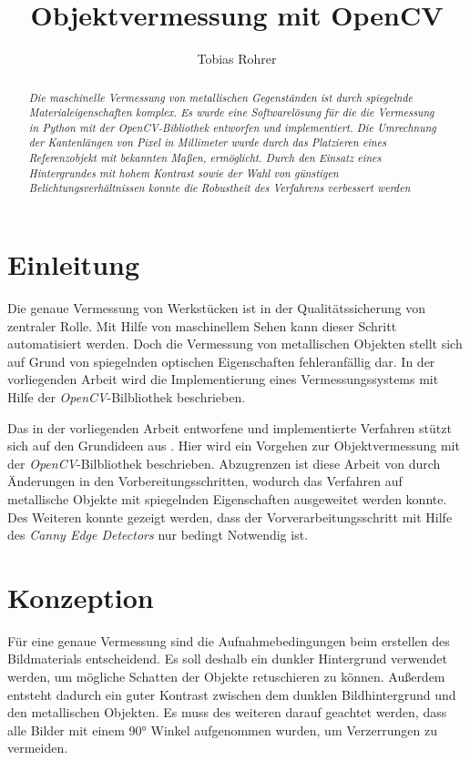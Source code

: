 \documentclass[twocolumn,10pt]{asme2ej}
\title{Objektvermessung mit OpenCV}
\author{Tobias Rohrer
    \affiliation{
	Data Science (Master)\\
	Hochschule Darmstadt\\
    Email: Tobias.Rohrer@outlook.com
    }	
}
\begin{document}
\maketitle    

\begin{abstract}
{\it Die maschinelle Vermessung von metallischen Gegenständen ist durch spiegelnde Materialeigenschaften komplex. Es wurde eine Softwarelösung für die die Vermessung in Python mit der \emph{OpenCV}-Bibliothek\cite{opencv_library} entworfen und implementiert. Die Umrechnung der Kantenlängen von Pixel in Millimeter wurde durch das Platzieren eines Referenzobjekt mit bekannten Maßen, ermöglicht.  Durch den Einsatz eines Hintergrundes mit hohem Kontrast sowie der Wahl von günstigen Belichtungsverhältnissen konnte die Robustheit des Verfahrens verbessert werden
}
\end{abstract}

\section{Einleitung}
Die genaue Vermessung von Werkstücken ist in der Qualitätssicherung von zentraler Rolle. Mit Hilfe von maschinellem Sehen kann dieser Schritt automatisiert werden. Doch die Vermessung von metallischen Objekten stellt sich auf Grund von spiegelnden optischen Eigenschaften fehleranfällig dar. In der vorliegenden Arbeit wird die Implementierung eines Vermessungssystems mit Hilfe der \emph{OpenCV}-Bilbliothek beschrieben. 

Das in der vorliegenden Arbeit entworfene und implementierte Verfahren stützt sich auf den Grundideen aus \cite{PyImageSearch}. Hier wird ein Vorgehen zur Objektvermessung mit der  \emph{OpenCV}-Bilbliothek beschrieben. Abzugrenzen ist diese Arbeit von \cite{PyImageSearch} durch Änderungen in den Vorbereitungsschritten, wodurch das Verfahren auf metallische Objekte mit spiegelnden Eigenschaften ausgeweitet werden konnte. Des Weiteren konnte gezeigt werden, dass der Vorverarbeitungsschritt mit Hilfe des \emph{Canny Edge Detectors}\cite{Canny} nur bedingt Notwendig ist.

\section{Konzeption}\label{sec:2}
Für eine genaue Vermessung sind die Aufnahmebedingungen beim erstellen des Bildmaterials entscheidend. Es soll deshalb ein dunkler Hintergrund verwendet werden, um mögliche Schatten der Objekte retuschieren zu können. Außerdem entsteht dadurch ein guter Kontrast zwischen dem dunklen Bildhintergrund und den metallischen Objekten. Es muss des weiteren darauf geachtet werden, dass alle Bilder mit einem \ang{90} Winkel aufgenommen wurden, um Verzerrungen zu vermeiden.
\end{document}
